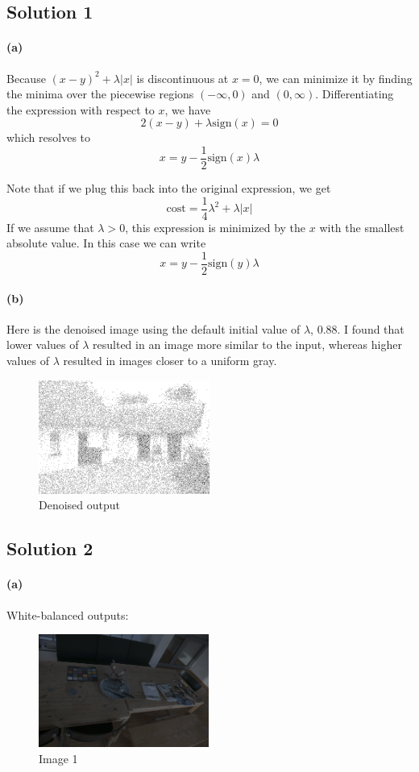 \documentclass{article}
\newcommand{\solution}[1]{\clearpage \subsection*{Solution #1}}
\newcommand{\spart}[1]{\paragraph{(#1)}}
\begin{document}

\solution{1}

\spart{a} Because $(x-y)^2 + \lambda|x|$ is discontinuous at $x=0$, we can minimize it by finding the minima over the piecewise regions $(-\infty, 0)$ and $(0, \infty)$. Differentiating the expression with respect to $x$, we have
\begin{equation}
2(x-y) + \lambda \text{sign}(x) = 0
\end{equation}
which resolves to 
\begin{equation}
x = y - \frac{1}{2} \text{sign}(x) \lambda
\end{equation}

Note that if we plug this back into the original expression, we get
\begin{equation}
\text{cost} = \frac{1}{4} \lambda^2+\lambda|x|
\end{equation}
If we assume that $\lambda>0$, this expression is minimized by the $x$ with the smallest absolute value. In this case we can write
\begin{equation}
x = y-\frac{1}{2} \text{sign}(y)\lambda
\end{equation}

\spart{b} Here is the denoised image using the default initial value of $\lambda$, 0.88. I found that lower values of $\lambda$ resulted in an image more similar to the input, whereas higher values of $\lambda$ resulted in images closer to a uniform gray. 

\begin{figure}[!h]
\centering
\includegraphics[width=0.5\textwidth]{code/outputs/prob1.png}
\caption{Denoised output}
\end{figure}

\solution{2}

\spart{a} White-balanced outputs:

\begin{figure}[!h]
  \centering
  \includegraphics[height=10em]{code/outputs/prob2a_1.png}
  \caption{Image 1}
\end{figure}
\end{document}
